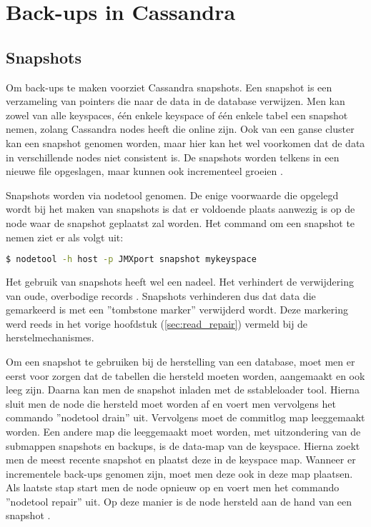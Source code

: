 \chapter{Back-ups in Cassandra}
\label{ch:cassandra_backups}

\section{Snapshots}
Om back-ups te maken voorziet Cassandra snapshots.
Een snapshot is een verzameling van pointers die naar de data in de database verwijzen.
Men kan zowel van alle keyspaces, één enkele keyspace of één enkele tabel een snapshot nemen, zolang Cassandra nodes heeft die online zijn.
Ook van een ganse cluster kan een snapshot genomen worden, maar hier kan het wel voorkomen dat de data in verschillende nodes niet consistent is.
De snapshots worden telkens in een nieuwe file opgeslagen, maar kunnen ook incrementeel groeien \citep{DataStax2016Snapshot}.

Snapshots worden via nodetool genomen.
De enige voorwaarde die opgelegd wordt bij het maken van snapshots is dat er voldoende plaats aanwezig is op de node waar de snapshot geplaatst zal worden.
Het command om een snapshot te nemen ziet er als volgt uit:

\begin{lstlisting}[language=Bash, breaklines=true]
$ nodetool -h host -p JMXport snapshot mykeyspace
\end{lstlisting}

Het gebruik van snapshots heeft wel een nadeel.
Het verhindert de verwijdering van oude, overbodige records \citep{DataStax2016Snapshot}.
Snapshots verhinderen dus dat data die gemarkeerd is met een ''tombstone marker'' verwijderd wordt.
Deze markering werd reeds in het vorige hoofdstuk (\ref{sec:read_repair}) vermeld bij de herstelmechanismes.

Om een snapshot te gebruiken bij de herstelling van een database, moet men er eerst voor zorgen dat de tabellen die hersteld moeten worden, aangemaakt en ook leeg zijn.
Daarna kan men de snapshot inladen met de sstableloader tool.
Hierna sluit men de node die hersteld moet worden af en voert men vervolgens het commando ''nodetool drain'' uit.
Vervolgens moet de commitlog map leeggemaakt worden.
Een andere map die leeggemaakt moet worden, met uitzondering van de submappen snapshots en backups, is de data-map van de keyspace.
Hierna zoekt men de meest recente snapshot en plaatst deze in de keyspace map.
Wanneer er incrementele back-ups genomen zijn, moet men deze ook in deze map plaatsen.
Als laatste stap start men de node opnieuw op en voert men het commando ''nodetool repair'' uit.
Op deze manier is de node hersteld aan de hand van een snapshot \citep{DataStax2016Snapshot}.

